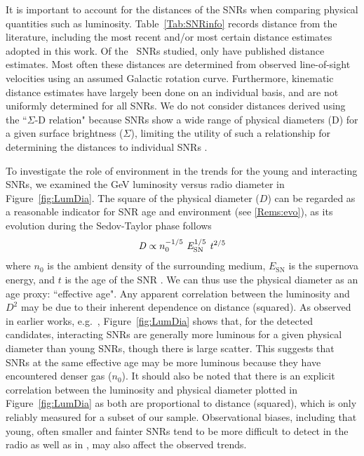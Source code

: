 It is important to account for the distances of the SNRs when comparing physical quantities such as luminosity. Table~\ref{Tab:SNRinfo}  records distance from the literature, including the most recent and/or most certain distance estimates adopted in this work. Of the \nGalSNRs~SNRs studied, only \ndist{} have published distance estimates. Most often these distances are determined from observed line-of-sight velocities using an assumed Galactic rotation curve. Furthermore, kinematic distance estimates have largely been done on an individual basis, and are not uniformly determined for all SNRs. We do not consider distances derived using the ``$\Sigma$-D relation" because SNRs show a wide range of physical diameters (D) for a given surface brightness ($\Sigma$), limiting the utility of such a relationship for determining the distances to individual SNRs \citep{Green12-distances}.

To investigate the role of environment in the trends for the young and interacting SNRs, we examined the GeV luminosity versus radio diameter in Figure~\ref{fig:LumDia}. The square of the physical diameter ($D$) can be regarded as a reasonable indicator for SNR age and environment (see \ref{Rems:evo}), as its evolution during the Sedov-Taylor phase follows
\begin{equation}
\label{eq:Sedov}
{\it D} \propto n_0^{-1/5} \ {\it E}_{\mathrm{SN}}^{1/5} \ {\it t}^{2/5}
\end{equation}
where $n_0$ is the ambient density of the surrounding medium, $E_{\mathrm{SN}}$ is the supernova energy, and $t$ is the age of the SNR \citep{1950RSPSA.201..159T,1959sdmm.book.....S}. We can thus use the physical diameter as an age proxy: ``effective age". Any apparent correlation between the luminosity and $D^2$ may be due to their inherent dependence on distance (squared). As observed in earlier works, e.g.~\cite{Thompson12-FermiCRsReview}, Figure~\ref{fig:LumDia} shows that, for the detected candidates, interacting SNRs are generally more luminous for a given physical diameter than young SNRs, though there is large scatter. This suggests that SNRs at the same effective age may be more luminous because they have encountered denser gas ($n_0$). It should also be noted that there is an explicit correlation between the luminosity and physical diameter plotted in Figure~\ref{fig:LumDia} as both are proportional to distance (squared), which is only reliably measured for a subset of our sample. Observational biases, including that young, often smaller and fainter SNRs tend to be more difficult to detect in the radio as well as in \gam{}, may also affect the observed trends.


